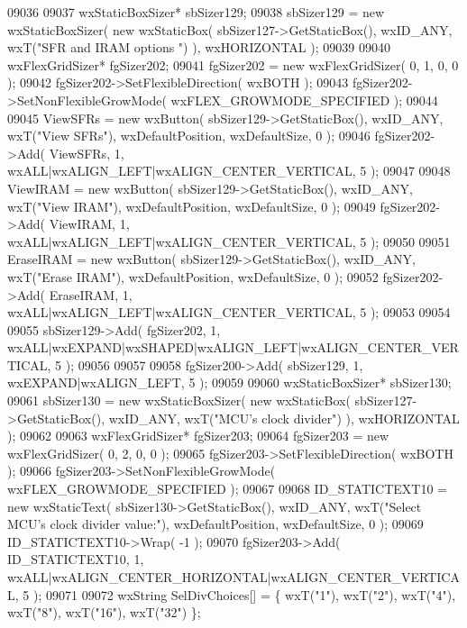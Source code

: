 \begin{DoxyCode}
09036     
09037     wxStaticBoxSizer* sbSizer129;
09038     sbSizer129 = \textcolor{keyword}{new} wxStaticBoxSizer( \textcolor{keyword}{new} wxStaticBox( sbSizer127->GetStaticBox(), wxID\_ANY, wxT(\textcolor{stringliteral}{"SFR and
       IRAM options "}) ), wxHORIZONTAL );
09039     
09040     wxFlexGridSizer* fgSizer202;
09041     fgSizer202 = \textcolor{keyword}{new} wxFlexGridSizer( 0, 1, 0, 0 );
09042     fgSizer202->SetFlexibleDirection( wxBOTH );
09043     fgSizer202->SetNonFlexibleGrowMode( wxFLEX\_GROWMODE\_SPECIFIED );
09044     
09045     ViewSFRs = \textcolor{keyword}{new} wxButton( sbSizer129->GetStaticBox(), wxID\_ANY, wxT(\textcolor{stringliteral}{"View SFRs"}), wxDefaultPosition, 
      wxDefaultSize, 0 );
09046     fgSizer202->Add( ViewSFRs, 1, wxALL|wxALIGN\_LEFT|wxALIGN\_CENTER\_VERTICAL, 5 );
09047     
09048     ViewIRAM = \textcolor{keyword}{new} wxButton( sbSizer129->GetStaticBox(), wxID\_ANY, wxT(\textcolor{stringliteral}{"View IRAM"}), wxDefaultPosition, 
      wxDefaultSize, 0 );
09049     fgSizer202->Add( ViewIRAM, 1, wxALL|wxALIGN\_LEFT|wxALIGN\_CENTER\_VERTICAL, 5 );
09050     
09051     EraseIRAM = \textcolor{keyword}{new} wxButton( sbSizer129->GetStaticBox(), wxID\_ANY, wxT(\textcolor{stringliteral}{"Erase IRAM"}), wxDefaultPosition, 
      wxDefaultSize, 0 );
09052     fgSizer202->Add( EraseIRAM, 1, wxALL|wxALIGN\_LEFT|wxALIGN\_CENTER\_VERTICAL, 5 );
09053     
09054     
09055     sbSizer129->Add( fgSizer202, 1, wxALL|wxEXPAND|wxSHAPED|wxALIGN\_LEFT|wxALIGN\_CENTER\_VERTICAL, 5 );
09056     
09057     
09058     fgSizer200->Add( sbSizer129, 1, wxEXPAND|wxALIGN\_LEFT, 5 );
09059     
09060     wxStaticBoxSizer* sbSizer130;
09061     sbSizer130 = \textcolor{keyword}{new} wxStaticBoxSizer( \textcolor{keyword}{new} wxStaticBox( sbSizer127->GetStaticBox(), wxID\_ANY, wxT(\textcolor{stringliteral}{"MCU's
       clock divider"}) ), wxHORIZONTAL );
09062     
09063     wxFlexGridSizer* fgSizer203;
09064     fgSizer203 = \textcolor{keyword}{new} wxFlexGridSizer( 0, 2, 0, 0 );
09065     fgSizer203->SetFlexibleDirection( wxBOTH );
09066     fgSizer203->SetNonFlexibleGrowMode( wxFLEX\_GROWMODE\_SPECIFIED );
09067     
09068     ID_STATICTEXT10 = \textcolor{keyword}{new} wxStaticText( sbSizer130->GetStaticBox(), wxID\_ANY, wxT(\textcolor{stringliteral}{"Select MCU's clock
       divider value:"}), wxDefaultPosition, wxDefaultSize, 0 );
09069     ID_STATICTEXT10->Wrap( -1 );
09070     fgSizer203->Add( ID_STATICTEXT10, 1, wxALL|wxALIGN\_CENTER\_HORIZONTAL|wxALIGN\_CENTER\_VERTICAL, 5 );
09071     
09072     wxString SelDivChoices[] = \{ wxT(\textcolor{stringliteral}{"1"}), wxT(\textcolor{stringliteral}{"2"}), wxT(\textcolor{stringliteral}{"4"}), wxT(\textcolor{stringliteral}{"8"}), wxT(\textcolor{stringliteral}{"16"}), wxT(\textcolor{stringliteral}{"32"}) \};

\end{DoxyCode}
